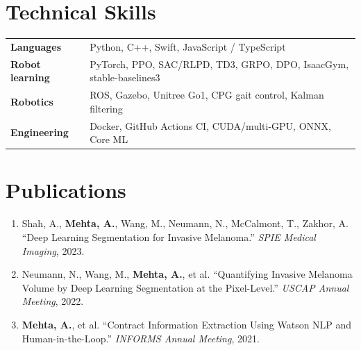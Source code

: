 \documentclass[10pt]{article}
\begin{document}
\section*{Technical Skills}
\begin{tabular}{@{}p{0.9in}l}
\textbf{Languages} & Python, C++, Swift, JavaScript / TypeScript \\
\textbf{Robot learning} & PyTorch, PPO, SAC/RLPD, TD3, GRPO, DPO, IsaacGym, stable-baselines3 \\
\textbf{Robotics} & ROS, Gazebo, Unitree Go1, CPG gait control, Kalman filtering \\
\textbf{Engineering} & Docker, GitHub Actions CI, CUDA/multi-GPU, ONNX, Core ML \\
\end{tabular}

\section*{Publications}
\begin{enumerate}[leftmargin=1.4em,itemsep=1pt,topsep=1pt]
\item Shah, A., \textbf{Mehta, A.}, Wang, M., Neumann, N., McCalmont, T., Zakhor, A. ``Deep Learning Segmentation for Invasive Melanoma.'' \textit{SPIE Medical Imaging}, 2023.
\item Neumann, N., Wang, M., \textbf{Mehta, A.}, et al. ``Quantifying Invasive Melanoma Volume by Deep Learning Segmentation at the Pixel-Level.'' \textit{USCAP Annual Meeting}, 2022.
\item \textbf{Mehta, A.}, et al. ``Contract Information Extraction Using Watson NLP and Human-in-the-Loop.'' \textit{INFORMS Annual Meeting}, 2021.
\end{enumerate}
\end{document}
